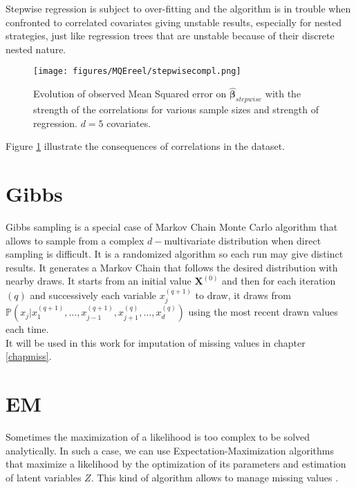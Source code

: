 \documentclass[12pt,a4paper]{report}
\begin{document}
		Stepwise regression is subject to over-fitting and the algorithm is in trouble when confronted to correlated covariates \cite{miller2002subset} giving unstable results, especially for nested strategies, just like regression trees that are unstable because of their discrete nested nature.
\begin{figure}
	 \centering
	  \texttt{[image: figures/MQEreel/stepwisecompl.png]}
	  \caption{Evolution of observed Mean Squared error on $\hat{\boldsymbol{\beta}}_{stepwise}$ with the strength of the correlations for various sample sizes and strength of regression. $d=5$ covariates. } \label{MQEstepwisecompl}
	\end{figure}
	Figure \ref{MQEstepwisecompl} illustrate the consequences of correlations in the dataset.
	
		\FloatBarrier
		
		\section{Gibbs}
		Gibbs sampling \cite{casella1992explaining} is a special case of Markov Chain Monte Carlo algorithm \cite{gilks1996markov,chib1995understanding,roberts2001optimal} that allows to sample from a complex $d-$multivariate distribution when direct sampling is difficult. It is a randomized algorithm so each run may give distinct results. It generates a Markov Chain that follows the desired distribution with nearby draws. It starts from an initial value $\boldsymbol{X}^{(0)}$ and then for each iteration $(q)$ and successively each variable $x_j^{(q+1)}$ to draw, it draws from $\mathbb{P}(x_j|x_1^{(q+1)}, \dots,x_{j-1}^{(q+1)},x_{j+1}^{(q)},\dots,x_d^{(q)})$ using the most recent drawn values each time. \\
		It will be used in this work for imputation of missing values in chapter \ref{chapmiss}.
		
		\section{EM}
			Sometimes the maximization of a likelihood is too complex to be solved analytically. In such a case, we can use Expectation-Maximization algorithms \cite{mclachlan2007algorithm} that maximize a likelihood by the optimization of its parameters and estimation of latent variables $Z$. This kind of algorithm allows to manage missing values \cite{dempster1977maximum}. \\
			
\end{document}
